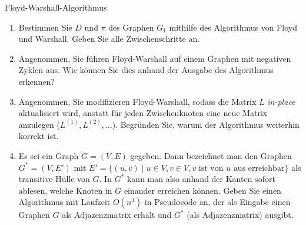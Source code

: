 \documentclass[11pt,a4paper]{article}
\begin{document}
\begin{aufgabe}{2}{Floyd-Warshall-Algorithmus}
    \begin{enumerate}
        \item Bestimmen Sie $D$ und $\pi$ des Graphen $G_1$ mithilfe des Algorithmus von Floyd und Warshall.
        Geben Sie alle Zwischenschritte an.
        \item Angenommen, Sie führen Floyd-Warshall auf einem Graphen mit negativen Zyklen aus.
        Wie können Sie dies anhand der Ausgabe des Algorithmus erkennen?
        \item Angenommen, Sie modifizieren Floyd-Warshall, sodass die Matrix $L$ \emph{in-place} aktualisiert wird, anstatt für jeden Zwischenknoten eine neue Matrix anzulegen ($L^{(1)}, L^{(2)}, \ldots$).
        Begründen Sie, warum der Algorithmus weiterhin korrekt ist.
        \item Es sei ein Graph $G = (V, E)$ gegeben.
        Dann bezeichnet man den Graphen $G^* = (V, E')$ mit $E' = \{(u, v) \mid u \in V, v \in V, \text{$v$ ist von $u$ aus erreichbar}\}$ als transitive Hülle von $G$.
        In $G^*$ kann man also anhand der Kanten sofort ablesen, welche Knoten in $G$ einander erreichen können.
        Geben Sie einen Algorithmus mit Laufzeit $O(n^3)$ in Pseudocode an, der als Eingabe einen Graphen $G$ als Adjazenzmatrix erhält und $G^*$ (als Adjazenzmatrix) ausgibt.
    \end{enumerate}
\end{aufgabe}
\end{document}

